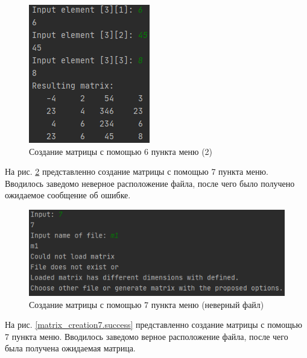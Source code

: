 \begin{figure}[hpt!]
	\centering
	\includegraphics[width=0.6\linewidth]{photo/matrix_creation6.2}
	\caption{Создание матрицы с помощью 6 пункта меню (2)}
	\label{matrix_creation6.2}
\end{figure}

\newpage

На рис. \ref{matrix_creation7.fail} представленно создание матрицы с помощью 7 пункта меню. 
Вводилось заведомо неверное расположение файла, после чего было получено ожидаемое сообщение об ошибке.

\begin{figure}[hpt!]
	\centering
	\includegraphics[width=0.6\linewidth]{photo/matrix_creation7.fail}
	\caption{Создание матрицы с помощью 7 пункта меню (неверный файл)}
	\label{matrix_creation7.fail}
\end{figure}

\newpage

На рис. \ref{matrix_creation7.success} представленно создание матрицы с помощью 7 пункта меню.
Вводилось заведомо верное расположение файла, после чего была получена ожидаемая матрица.

